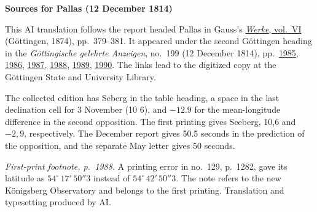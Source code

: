 \clearpage\thispagestyle{empty}
\begin{center}\textbf{Sources for Pallas (12 December 1814)}\end{center}
\noindent This AI translation follows the report headed Pallas in Gauss’s \href{https://gdz.sub.uni-goettingen.de/id/PPN236007467}{\textit{Werke}, vol.~VI} (Göttingen, 1874), pp.~379--381. It appeared under the second Göttingen heading in the \textit{Göttingische gelehrte Anzeigen}, no.~199 (12 December 1814), pp.~\href{https://images.p.sub.uni-goettingen.de/iiif/image/gdz:PPN319721507_1814:00001993/full/1600,/0/default.jpg}{1985}, \href{https://images.p.sub.uni-goettingen.de/iiif/image/gdz:PPN319721507_1814:00001994/full/1600,/0/default.jpg}{1986}, \href{https://images.p.sub.uni-goettingen.de/iiif/image/gdz:PPN319721507_1814:00001995/full/1600,/0/default.jpg}{1987}, \href{https://images.p.sub.uni-goettingen.de/iiif/image/gdz:PPN319721507_1814:00001996/full/1600,/0/default.jpg}{1988}, \href{https://images.p.sub.uni-goettingen.de/iiif/image/gdz:PPN319721507_1814:00001997/full/1600,/0/default.jpg}{1989}, \href{https://images.p.sub.uni-goettingen.de/iiif/image/gdz:PPN319721507_1814:00001998/full/1600,/0/default.jpg}{1990}. The links lead to the digitized copy at the Göttingen State and University Library.
\par\smallskip\noindent The collected edition has Seberg in the table heading, a space in the last declination cell for 3 November (10 6), and $-12.9$ for the mean-longitude difference in the second opposition. The first printing gives Seeberg, 10,6 and $-2{,}9$, respectively. The December report gives 50.5 seconds in the prediction of the opposition, and the separate May letter gives 50 seconds.
\par\smallskip\noindent \textit{First-print footnote, p.~1988.} A printing error in no.~129, p.~1282, gave its latitude as $54^\circ\,17'\,50''3$ instead of $54^\circ\,42'\,50''3$. The note refers to the new Königsberg Observatory and belongs to the first printing. Translation and typesetting produced by AI.
\clearpage
